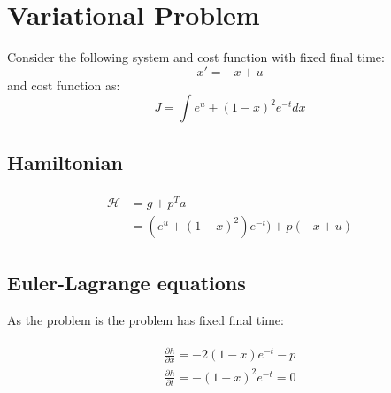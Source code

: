 \documentclass{article}
\begin{document}
\section{Variational Problem}
Consider the following system and cost function with fixed final time:
\begin{equation}
x' = -x + u
\end{equation}
and cost function as:
\begin{equation}
J = \int e^u + (1-x)^2  e^{-t} dx 
\end{equation}
\subsection{Hamiltonian}
\begin{eqnarray*}
\begin{split}
\mathcal{H} &= g +p^Ta \\
&= (e^u+(1-x)^2)e^{-t})+p(-x+u)
\end{split}
\end{eqnarray*}

\subsection{Euler-Lagrange equations}


As the problem is the problem has fixed final time:

\begin{eqnarray*}
\begin{split}
\frac{\partial h}{\partial x} = -2(1-x)e^{-t}-p \\
\frac{\partial h}{\partial t} = -(1-x)^2e^{-t} = 0
\end{split}
\end{eqnarray*}
\end{document}
